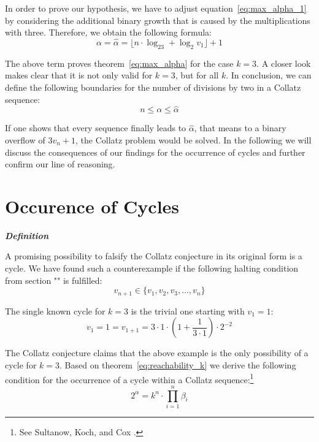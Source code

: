 \documentclass{SciPress_2015}
\renewcommand{\subsection}[1]{\textit{\textbf{#1}}}
\begin{document}
\par\medskip
In order to prove our hypothesis, we have to adjust equation~\ref{eq:max_alpha_1} by considering the additional binary growth that is caused by the multiplications with three. Therefore, we obtain the following formula:
\begin{equation}
\label{eq:max_alpha_k}
	\alpha=\hat\alpha=\lfloor n\cdot\log_23+\log_2v_1\rfloor+1
\end{equation}

The above term proves theorem~\ref{eq:max_alpha} for the case $k=3$. A closer look makes clear that it is not only valid for $k=3$, but for all $k$. In conclusion, we can define the following boundaries for the number of divisions by two in a Collatz sequence:
\begin{equation}
n\le\alpha\le\hat\alpha
\end{equation}

If one shows that every sequence finally leads to $\hat\alpha$, that means to a binary overflow of $3v_n+1$, the Collatz problem would be solved. In the following we will discuss the consequences of our findings for the occurrence of cycles and further confirm our line of reasoning.

\section{Occurence of Cycles}
\subsection{Definition}
\par\noindent
A promising possibility to falsify the Collatz conjecture in its original form is a cycle. We have found such a counterexample if the following halting condition from section "" is fulfilled:
\[
v_{n+1}\in\{v_1,v_2,v_3,\ldots,v_n\}
\]
\par\noindent
The single known cycle for $k=3$ is the trivial one starting with $v_1=1$:
\[
	v_1=1=v_{1+1}=3\cdot1\cdot\left(1+\frac{1}{3\cdot1}\right)\cdot2^{-2}
\]

The Collatz conjecture claims that the above example is the only possibility of a cycle for $k=3$. Based on theorem~\ref{eq:reachability_k} we derive the following condition for the occurrence of a cycle within a Collatz sequence:\footnote{See Sultanow, Koch, and Cox \cite[p.~11]{Ref_Sultanow_Koch_Cox_2020}.}
\begin{equation}
\label{eq:cycle}
    2^{\alpha}=k^n\cdot\prod_{i=1}^{n}\beta_i
\end{equation}
\end{document}
